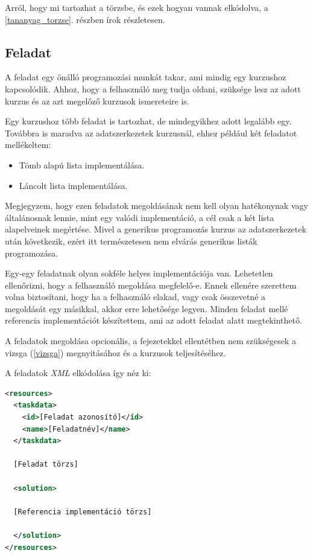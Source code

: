 \documentclass[12pt,a4paper]{article}
\newcommand{\xml}{\textit{XML}\xspace}
\begin{document}
	Arról, hogy mi tartozhat a törzsbe, és ezek hogyan vannak elkódolva, a \ref{tananyag_torzse}. részben írok részletesen.
	
	\subsection{Feladat}\label{feladat}
	
	A feladat egy önálló programozási munkát takar, ami mindig egy kurzushoz kapcsolódik. Ahhoz, hogy a felhasználó meg tudja oldani, szüksége lesz az adott kurzus és az azt megelőző kurzusok ismereteire is.
	
	Egy kurzushoz több feladat is tartozhat, de mindegyikhez adott legalább egy. Továbbra is maradva az adatszerkezetek kurzusnál, ehhez például két feladatot mellékeltem:
	
	\begin{itemize}
		\item Tömb alapú lista implementálása.
		\item Láncolt lista implementálása.
	\end{itemize}

	Megjegyzem, hogy ezen feladatok megoldásának nem kell olyan hatékonynak vagy általánosnak lennie, mint egy valódi implementáció, a cél csak a két lista alapelveinek megértése. Mivel a generikus programozás kurzus az adatszerkezetek után következik, ezért itt természetesen nem elvárás generikus listák programozása.

	Egy-egy feladatnak olyan sokféle helyes implementációja van. Lehetetlen ellenőrizni, hogy a felhasználó megoldása megfelelő-e. Ennek ellenére szerettem volna biztosítani, hogy ha a felhasználó elakad, vagy csak összevetné a megoldását egy másikkal, akkor erre lehetősége legyen. Minden feladat mellé referencia implementációt készítettem, ami az adott feladat alatt megtekinthető. 

	A feladatok megoldása opcionális, a fejezetekkel ellentétben nem szükségesek a vizsga (\ref{vizsga}) megnyitásához és a kurzusok teljesítéséhez.

	A feladatok \xml elkódolása így néz ki:
	
	\bigskip
	\begin{lstlisting}[language=XML]
<resources>
  <taskdata>
    <id>[Feladat azonosító]</id>
    <name>[Feladatnév]</name>
  </taskdata>
  
  [Feladat törzs]
  	
  <solution>
  
  [Referencia implementáció törzs]
  
  </solution>
</resources>
	\end{lstlisting}
	\bigskip
\end{document}
